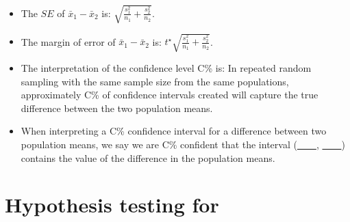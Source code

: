 \begin{itemize}
\item The $SE$ of $\bar{x}_1-\bar{x}_2$ is:  $\sqrt{\frac{s^2_1}{n_1}+\frac{s^2_2}{n_2}}$.


\item The margin of error of $\bar{x}_1-\bar{x}_2$ is: $t^{\star}\sqrt{\frac{s^2_1}{n_1}+\frac{s^2_2}{n_2}}$.

\item The interpretation of the confidence level C\% is:  In repeated random
sampling with the same sample size from the same populations, approximately
C\% of confidence intervals created will capture the true difference between the two
population means.

\item When interpreting a C\% confidence interval for a difference between two
population means, we say we are C\% confident that the interval (\underline{\ \ \ \ }, \underline{\ \ \ \ }) contains
the value of the difference in the population means.

\end{itemize}


{}

\section[Hypothesis testing for a difference in population means]{Hypothesis testing for }
\label{differenceOfTwoMeansTest}

